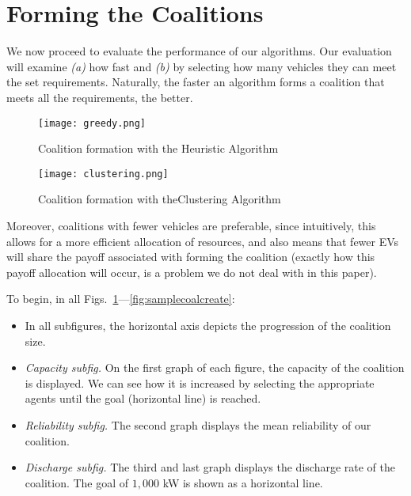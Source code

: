 \section{Forming the Coalitions}
We now proceed to evaluate the performance of our algorithms. Our evaluation will examine {\em (a)} how fast and {\em (b)} by selecting how many vehicles they can meet the set requirements. Naturally, the faster an algorithm forms a coalition that meets all the requirements, the better. 
\begin{figure}
	\centering
		\texttt{[image: greedy.png]}
		\caption{Coalition formation with the\newline
			Heuristic Algorithm \label{fig:heuristiccoalcreate}}
\end{figure}
\begin{figure}	
	\centering
		\texttt{[image: clustering.png]}
		\caption{Coalition formation with the\newline Clustering Algorithm\label{fig:clusteringcoalcreate}}
\end{figure}

Moreover, coalitions with fewer vehicles are preferable, since intuitively, this allows for a more efficient allocation of resources, and also means that fewer EVs will share the payoff associated with forming the coalition (exactly how this payoff allocation will occur, is a problem we do not deal with in this paper).

To begin, in all Figs.~\ref{fig:heuristiccoalcreate}---\ref{fig:samplecoalcreate}:
\begin{itemize}
	\item In all subfigures, the horizontal axis depicts the progression of the coalition size.
	\item {\em Capacity subfig.} On the first graph of each figure, the capacity of the coalition is displayed. We can see how it is increased by selecting the appropriate agents until the goal (horizontal line) is reached.
	\item {\em Reliability subfig.} The second graph displays the mean reliability of our coalition.
	\item {\em Discharge subfig.} The third and last graph displays the discharge rate of the coalition. The goal of $1,000$ kW is shown as a horizontal line.
\end{itemize}
